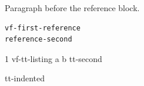 \documentclass{article}
\begin{document}
Paragraph before the reference block.
\begin{verbatim}
vf-first-reference
reference-second
\end{verbatim}
\begin{listing}{1}
vf-tt-listing a  b
tt-second

    tt-indented
\end{listing}
\end{document}
